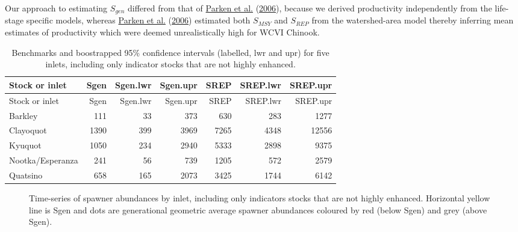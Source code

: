 \documentclass[11pt]{book}
\begin{document}
Our approach to estimating \(S_{gen}\) differed from that of \protect\hyperlink{ref-parkenHabitatbasedMethodsEstimate2006}{Parken et al.} (\protect\hyperlink{ref-parkenHabitatbasedMethodsEstimate2006}{2006}), because we derived productivity independently from the life-stage specific models, whereas \protect\hyperlink{ref-parkenHabitatbasedMethodsEstimate2006}{Parken et al.} (\protect\hyperlink{ref-parkenHabitatbasedMethodsEstimate2006}{2006}) estimated both \(S_{MSY}\) and \(S_{REP}\) from the watershed-area model thereby inferring mean estimates of productivity which were deemed unrealistically high for WCVI Chinook.
\begin{longtable}[]{@{}lrrrrrr@{}}
\caption{\label{tab:chinook-benchmarks}Benchmarks and boostrapped 95\% confidence intervals (labelled, lwr and upr) for five inlets, including only indicator stocks that are not highly enhanced.}\tabularnewline
\toprule
Stock or inlet & Sgen & Sgen.lwr & Sgen.upr & SREP & SREP.lwr & SREP.upr \\
\midrule
\endfirsthead
\toprule
Stock or inlet & Sgen & Sgen.lwr & Sgen.upr & SREP & SREP.lwr & SREP.upr \\
\midrule
\endhead
Barkley & 111 & 33 & 373 & 630 & 283 & 1277 \\
Clayoquot & 1390 & 399 & 3969 & 7265 & 4348 & 12556 \\
Kyuquot & 1050 & 234 & 2940 & 5333 & 2898 & 9375 \\
Nootka/Esperanza & 241 & 56 & 739 & 1205 & 572 & 2579 \\
Quatsino & 658 & 165 & 2073 & 3425 & 1744 & 6142 \\
\bottomrule
\end{longtable}
\begin{figure}[htb]

{\centering {} 

}

\caption{Time-series of spawner abundances by inlet, including only indicators stocks that are not highly enhanced. Horizontal yellow line is Sgen and dots are generational geometric average spawner abundances coloured by red (below Sgen) and grey (above Sgen).}\label{fig:chinook-InletTimeSeries}
\end{figure}
\end{document}
